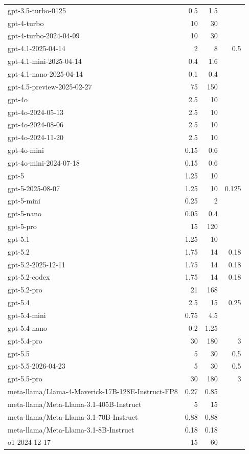 \begin{longtable}{lrrr}
gpt-3.5-turbo-0125 & 0.5 & 1.5 &  \\
gpt-4-turbo & 10 & 30 &  \\
gpt-4-turbo-2024-04-09 & 10 & 30 &  \\
gpt-4.1-2025-04-14 & 2 & 8 & 0.5 \\
gpt-4.1-mini-2025-04-14 & 0.4 & 1.6 &  \\
gpt-4.1-nano-2025-04-14 & 0.1 & 0.4 &  \\
gpt-4.5-preview-2025-02-27 & 75 & 150 &  \\
gpt-4o & 2.5 & 10 &  \\
gpt-4o-2024-05-13 & 2.5 & 10 &  \\
gpt-4o-2024-08-06 & 2.5 & 10 &  \\
gpt-4o-2024-11-20 & 2.5 & 10 &  \\
gpt-4o-mini & 0.15 & 0.6 &  \\
gpt-4o-mini-2024-07-18 & 0.15 & 0.6 &  \\
gpt-5 & 1.25 & 10 &  \\
gpt-5-2025-08-07 & 1.25 & 10 & 0.125 \\
gpt-5-mini & 0.25 & 2 &  \\
gpt-5-nano & 0.05 & 0.4 &  \\
gpt-5-pro & 15 & 120 &  \\
gpt-5.1 & 1.25 & 10 &  \\
gpt-5.2 & 1.75 & 14 & 0.18 \\
gpt-5.2-2025-12-11 & 1.75 & 14 & 0.18 \\
gpt-5.2-codex & 1.75 & 14 & 0.18 \\
gpt-5.2-pro & 21 & 168 &  \\
gpt-5.4 & 2.5 & 15 & 0.25 \\
gpt-5.4-mini & 0.75 & 4.5 &  \\
gpt-5.4-nano & 0.2 & 1.25 &  \\
gpt-5.4-pro & 30 & 180 & 3 \\
gpt-5.5 & 5 & 30 & 0.5 \\
gpt-5.5-2026-04-23 & 5 & 30 & 0.5 \\
gpt-5.5-pro & 30 & 180 & 3 \\
meta-llama/Llama-4-Maverick-17B-128E-Instruct-FP8 & 0.27 & 0.85 &  \\
meta-llama/Meta-Llama-3.1-405B-Instruct & 5 & 15 &  \\
meta-llama/Meta-Llama-3.1-70B-Instruct & 0.88 & 0.88 &  \\
meta-llama/Meta-Llama-3.1-8B-Instruct & 0.18 & 0.18 &  \\
o1-2024-12-17 & 15 & 60 &  \\

\end{longtable}
